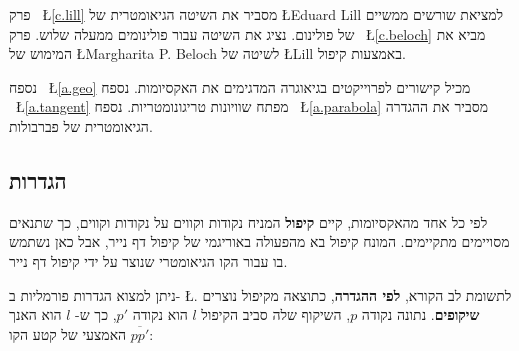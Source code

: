 פרק%
~\L{\ref{c.lill}}
מסביר את השיטה הגיאומטרית של 
\L{Eduard Lill}
למציאת שורשים ממשיים של פולינום. נציג את השיטה עבור פולינומים ממעלה שלוש. פרק%
~\L{\ref{c.beloch}}
מביא את המימוש של
\L{Margharita P. Beloch}
לשיטה של 
\L{Lill}
באמצעות קיפול.

נספח%
~\L{\ref{a.geo}}
מכיל קישורים לפרוייקטים בגיאוגרה המדגימים את האקסיומות. נספח%
~\L{\ref{a.tangent}}
מפתח שוויונות טריגונומטריות. נספח%
~\L{\ref{a.parabola}}
מסביר את ההגדרה הגיאומטרית של פברבולות.

\subsection*{הגדרות}

לפי כל אחד מהאקסיומות, קיים
\textbf{קיפול}
המניח נקודות וקווים על נקודות וקווים, כך שתנאים מסויימים מתקיימים. המונח קיפול בא מהפעולה באוריגמי של קיפול דף נייר, אבל כאן נשתמש בו עבור הקו הגיאומטרי שנוצר על ידי קיפול דף נייר.

ניתן למצוא הגדרות פורמליות ב-%
\L{\cite[10~]{martin}}.
לתשומת לב הקורא, 
\textbf{לפי ההגדרה},
כתוצאה מקיפול נוצרים 
\textbf{שיקופים}.
נתונה נקודה 
$p$,
השיקוף שלה סביב הקיפול 
$l$
הוא נקודה
$p'$,
כך ש-%
$l$
הוא האנך האמצעי של קטע הקו
$\overline{pp'}$:

\begin{center}
\end{center}
